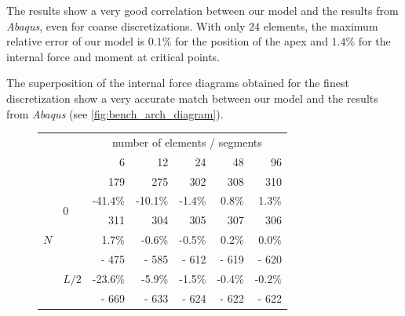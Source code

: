 The results show a very good correlation between our model and the results from \emph{Abaqus}, even for coarse discretizations. With only $24$ elements, the maximum relative error of our model is $0.1\%$ for the position of the apex and $1.4\%$ for the internal force and moment at critical points.

The superposition of the internal force diagrams obtained for the finest discretization show a very accurate match between our model and the results from \emph{Abaqus} (see \cref{fig:bench_arch_diagram}).

\begin{figure}[p]
	\centering
	\begin{fullpage}
\begin{tabularx}{0.6\textwidth}{@{} XX rrrrr@{}}
\toprule
& & \multicolumn{5}{c}{number of elements / segments} \\ \cmidrule{3-7}
&  &  6 & 12 & 24 & 48 & 96 \\
\midrule
\multirow{12}{*}{$N$}&\multirow{4}{*}{$0$}&{\color{Tblue}\normalsize 179}&{\color{Tblue}\normalsize 275}&{\color{Tblue}\normalsize 302}&{\color{Tblue}\normalsize 308}&{\color{Tblue}\normalsize 310}\\
&&{\color{Tblue}\scriptsize-41.4\%}&{\color{Tblue}\scriptsize-10.1\%}&{\color{Tblue}\scriptsize-1.4\%}&{\color{Tblue}\scriptsize0.8\%}&{\color{Tblue}\scriptsize1.3\%}\\
&&{\color{black}\normalsize 311}&{\color{black}\normalsize 304}&{\color{black}\normalsize 305}&{\color{black}\normalsize 307}&{\color{black}\normalsize 306}\\
&&{\color{black}\scriptsize1.7\%}&{\color{black}\scriptsize-0.6\%}&{\color{black}\scriptsize-0.5\%}&{\color{black}\scriptsize0.2\%}&{\color{black}\scriptsize0.0\%}\\\cmidrule[0.5\cmidrulewidth]{2-7}
&\multirow{4}{*}{$L/2$}&{\color{Tblue}\normalsize- 475}&{\color{Tblue}\normalsize- 585}&{\color{Tblue}\normalsize- 612}&{\color{Tblue}\normalsize- 619}&{\color{Tblue}\normalsize- 620}\\
&&{\color{Tblue}\scriptsize-23.6\%}&{\color{Tblue}\scriptsize-5.9\%}&{\color{Tblue}\scriptsize-1.5\%}&{\color{Tblue}\scriptsize-0.4\%}&{\color{Tblue}\scriptsize-0.2\%}\\
&&{\color{black}\normalsize- 669}&{\color{black}\normalsize- 633}&{\color{black}\normalsize- 624}&{\color{black}\normalsize- 622}&{\color{black}\normalsize- 622}\\

\end{tabularx}
\end{fullpage}
\end{figure}
